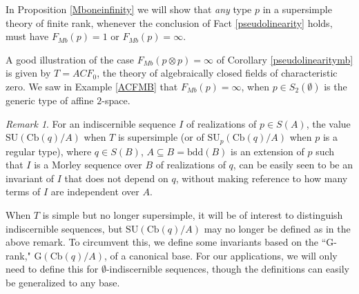 \documentclass[11pt]{amsart}
\newcommand{\Fmb}[1]{F_{Mb}\left( #1  \right)}
\theoremstyle{definition}
\theoremstyle{remark}
\newtheorem{remark}[theorem]{Remark}
\newcommand{\m}{\mathbb }
\newcommand{\mb}{F_{Mb} }
\numberwithin{equation}{section}
\begin{document}
In Proposition \ref{Mboneinfinity} we will show that \textit{any} type $p$ in a supersimple theory of finite rank, whenever the conclusion of Fact \ref{pseudolinearity} holds, must have $F_{Mb}(p) =1$ or $F_{Mb}(p) = \infty$.


A good illustration of the case $F_{Mb}(p \otimes p) = \infty$ of Corollary \ref{pseudolinearitymb} is given by $T=ACF_0$, the theory of algebraically closed fields of characteristic zero. We saw in Example \ref{ACFMB} that $\Fmb {p} = \infty$, when $p \in S_2 ( \emptyset )$ is the generic type of affine $2$-space.



\begin{remark} \label{rankofcanonicalbaseinvariant}
    For an indiscernible sequence $I$ of realizations of $p \in S(A)$, the value $\mathrm{SU}(\mathrm{Cb}(q)/A)$ when $T$ is supersimple (or of $\mathrm{SU}_{p}(\mathrm{Cb}(q)/A)$ when $p$ is a regular type), where $ q \in S(B)$, $A \subseteq B = \mathrm{bdd}(B)$ is an extension of $p$ such that $I$ is a Morley sequence over $B$ of realizations of $q$, can be easily seen to be an invariant of $I$ that does not depend on $q$, without making reference to how many terms of $I$ are independent over $A$.
\end{remark}

When $T$ is simple but no longer supersimple, it will be of interest to distinguish indiscernible sequences, but $\mathrm{SU}(\mathrm{Cb}(q)/A)$ may no longer be defined as in the above remark. To circumvent this, we define some invariants based on the ``$\mathrm{G}$-rank," $\mathrm{G}(\mathrm{Cb}(q)/A)$, of a canonical base. For our applications, we will only need to define this for $\emptyset$-indiscernible sequences, though the definitions can easily be generalized to any base.
\end{document}
